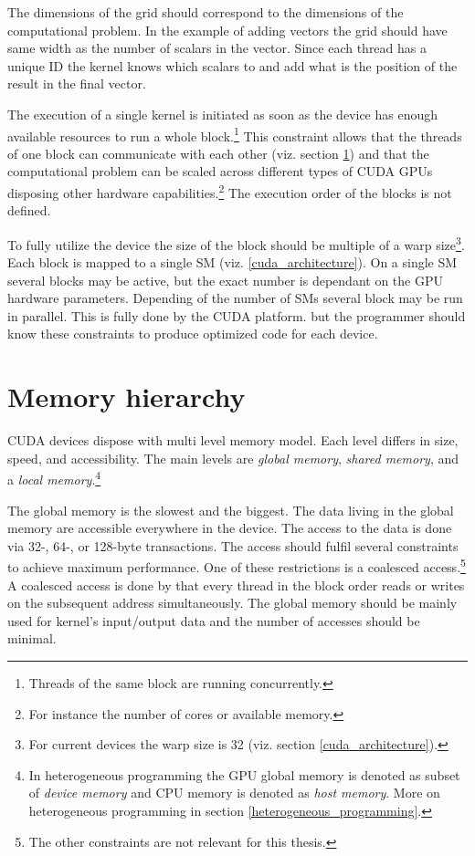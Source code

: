 \documentclass[12pt,oneside]{fithesis2}
\begin{document}
\noindent
The dimensions of the grid should correspond to the dimensions of the computational problem. In the example of adding vectors the grid should have same width as the number of scalars in the vector. Since each thread has a unique ID the kernel knows which scalars to and add what is the position of the result in the final vector.

The execution of a single kernel is initiated as soon as the device has enough available resources to run a whole block.\footnote{Threads of the same block are running concurrently.} This constraint allows that the threads of one block can communicate with each other (viz. section \ref{memory_hiearchy}) and that the computational problem can be scaled across different types of CUDA GPUs disposing other hardware capabilities.\footnote{For instance the number of cores or available memory.} The execution order of the blocks is not defined.

To fully utilize the device the size of the block should be multiple of a warp size\footnote{For current devices the warp size is 32 (viz. section \ref{cuda_architecture}).}. Each block is mapped to a single SM (viz. \ref{cuda_architecture}). On a single SM several blocks may be active, but the exact number is dependant on the GPU hardware parameters. Depending of the number of SMs several block may be run in parallel. This is fully done by the CUDA platform. but the programmer should know these constraints to produce optimized code for each device.

\section{Memory hierarchy}
\label{memory_hiearchy}

CUDA devices dispose with multi level memory model. Each level differs in size, speed, and accessibility. The main levels are \emph{global memory}, \emph{shared memory}, and a \emph{local memory}.\footnote{In heterogeneous programming the GPU global memory is denoted as subset of \emph{device memory} and CPU memory is denoted as \emph{host memory}. More on heterogeneous programming in section \ref{heterogeneous_programming}.} 

The global memory is the slowest and the biggest. The data living in the global memory are accessible everywhere in the device. The access to the data is done via 32-, 64-, or 128-byte transactions. The access should fulfil several constraints to achieve maximum performance. One of these restrictions is a coalesced access.\footnote{The other constraints are not relevant for this thesis.} A coalesced access is done by that every thread in the block order reads or writes on the subsequent address simultaneously. The global memory should be mainly used for kernel's input/output data and the number of accesses should be minimal.
\end{document}
